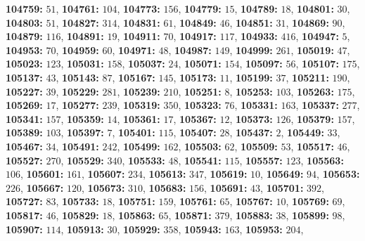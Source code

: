 \textsf{\bfseries 104759:} $51$, \textsf{\bfseries 104761:} $104$, \textsf{\bfseries 104773:} $156$, \textsf{\bfseries 104779:} $15$, \textsf{\bfseries 104789:} $18$, \textsf{\bfseries 104801:} $30$, \textsf{\bfseries 104803:} $51$, \textsf{\bfseries 104827:} $314$, \textsf{\bfseries 104831:} $61$, \textsf{\bfseries 104849:} $46$, \textsf{\bfseries 104851:} $31$, \textsf{\bfseries 104869:} $90$, \textsf{\bfseries 104879:} $116$, \textsf{\bfseries 104891:} $19$, \textsf{\bfseries 104911:} $70$, \textsf{\bfseries 104917:} $117$, \textsf{\bfseries 104933:} $416$, \textsf{\bfseries 104947:} $5$, \textsf{\bfseries 104953:} $70$, \textsf{\bfseries 104959:} $60$, \textsf{\bfseries 104971:} $48$, \textsf{\bfseries 104987:} $149$, \textsf{\bfseries 104999:} $261$, \textsf{\bfseries 105019:} $47$, \textsf{\bfseries 105023:} $123$, \textsf{\bfseries 105031:} $158$, \textsf{\bfseries 105037:} $24$, \textsf{\bfseries 105071:} $154$, \textsf{\bfseries 105097:} $56$, \textsf{\bfseries 105107:} $175$, \textsf{\bfseries 105137:} $43$, \textsf{\bfseries 105143:} $87$, \textsf{\bfseries 105167:} $145$, \textsf{\bfseries 105173:} $11$, \textsf{\bfseries 105199:} $37$, \textsf{\bfseries 105211:} $190$, \textsf{\bfseries 105227:} $39$, \textsf{\bfseries 105229:} $281$, \textsf{\bfseries 105239:} $210$, \textsf{\bfseries 105251:} $8$, \textsf{\bfseries 105253:} $103$, \textsf{\bfseries 105263:} $175$, \textsf{\bfseries 105269:} $17$, \textsf{\bfseries 105277:} $239$, \textsf{\bfseries 105319:} $350$, \textsf{\bfseries 105323:} $76$, \textsf{\bfseries 105331:} $163$, \textsf{\bfseries 105337:} $277$, \textsf{\bfseries 105341:} $157$, \textsf{\bfseries 105359:} $14$, \textsf{\bfseries 105361:} $17$, \textsf{\bfseries 105367:} $12$, \textsf{\bfseries 105373:} $126$, \textsf{\bfseries 105379:} $157$, \textsf{\bfseries 105389:} $103$, \textsf{\bfseries 105397:} $7$, \textsf{\bfseries 105401:} $115$, \textsf{\bfseries 105407:} $28$, \textsf{\bfseries 105437:} $2$, \textsf{\bfseries 105449:} $33$, \textsf{\bfseries 105467:} $34$, \textsf{\bfseries 105491:} $242$, \textsf{\bfseries 105499:} $162$, \textsf{\bfseries 105503:} $62$, \textsf{\bfseries 105509:} $53$, \textsf{\bfseries 105517:} $46$, \textsf{\bfseries 105527:} $270$, \textsf{\bfseries 105529:} $340$, \textsf{\bfseries 105533:} $48$, \textsf{\bfseries 105541:} $115$, \textsf{\bfseries 105557:} $123$, \textsf{\bfseries 105563:} $106$, \textsf{\bfseries 105601:} $161$, \textsf{\bfseries 105607:} $234$, \textsf{\bfseries 105613:} $347$, \textsf{\bfseries 105619:} $10$, \textsf{\bfseries 105649:} $94$, \textsf{\bfseries 105653:} $226$, \textsf{\bfseries 105667:} $120$, \textsf{\bfseries 105673:} $310$, \textsf{\bfseries 105683:} $156$, \textsf{\bfseries 105691:} $43$, \textsf{\bfseries 105701:} $392$, \textsf{\bfseries 105727:} $83$, \textsf{\bfseries 105733:} $18$, \textsf{\bfseries 105751:} $159$, \textsf{\bfseries 105761:} $65$, \textsf{\bfseries 105767:} $10$, \textsf{\bfseries 105769:} $69$, \textsf{\bfseries 105817:} $46$, \textsf{\bfseries 105829:} $18$, \textsf{\bfseries 105863:} $65$, \textsf{\bfseries 105871:} $379$, \textsf{\bfseries 105883:} $38$, \textsf{\bfseries 105899:} $98$, \textsf{\bfseries 105907:} $114$, \textsf{\bfseries 105913:} $30$, \textsf{\bfseries 105929:} $358$, \textsf{\bfseries 105943:} $163$, \textsf{\bfseries 105953:} $204$, 
